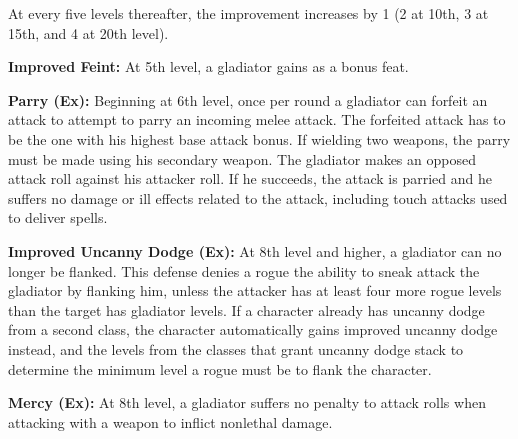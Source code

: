 At every five levels thereafter, the improvement increases by 1 (2 at 10th, 3 at 15th, and 4 at 20th level).

\textbf{Improved Feint:} At 5th level, a gladiator gains  as a bonus feat.

\textbf{Parry (Ex):} Beginning at 6th level, once per round a gladiator can forfeit an attack to attempt to parry an incoming melee attack. The forfeited attack has to be the one with his highest base attack bonus. If wielding two weapons, the parry must be made using his secondary weapon. The gladiator makes an opposed attack roll against his attacker roll. If he succeeds, the attack is parried and he suffers no damage or ill effects related to the attack, including touch attacks used to deliver spells.

\textbf{Improved Uncanny Dodge (Ex):} At 8th level and higher, a gladiator can no longer be flanked. This defense denies a rogue the ability to sneak attack the gladiator by flanking him, unless the attacker has at least four more rogue levels than the target has gladiator levels. If a character already has uncanny dodge from a second class, the character automatically gains improved uncanny dodge instead, and the levels from the classes that grant uncanny dodge stack to determine the minimum level a rogue must be to flank the character.

\textbf{Mercy (Ex):} At 8th level, a gladiator suffers no penalty to attack rolls when attacking with a weapon to inflict nonlethal damage.



